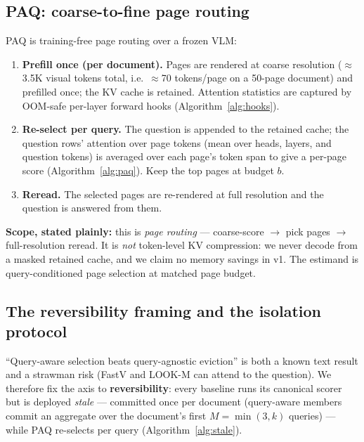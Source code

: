 \documentclass[11pt,letterpaper]{article}
\newcommand{\paq}{\textsc{PAQ}}
\begin{document}
\subsection{\paq{}: coarse-to-fine page routing}\label{sec:method-paq}
\paq{} is training-free page routing over a frozen VLM:
\begin{enumerate}
  \item \textbf{Prefill once (per document).} Pages are rendered at coarse resolution
        ($\approx$3.5K visual tokens total, i.e.\ $\approx$70 tokens/page on a 50-page document)
        and prefilled once; the KV cache is retained. Attention statistics are captured by
        OOM-safe per-layer forward hooks (Algorithm~\ref{alg:hooks}).
  \item \textbf{Re-select per query.} The question is appended to the retained cache; the
        question rows' attention over page tokens (mean over heads, layers, and question tokens)
        is averaged over each page's token span to give a per-page score
        (Algorithm~\ref{alg:paq}). Keep the top pages at budget $b$.
  \item \textbf{Reread.} The selected pages are re-rendered at full resolution and the question
        is answered from them.
\end{enumerate}
\textbf{Scope, stated plainly:} this is \emph{page routing} --- coarse-score $\to$ pick pages
$\to$ full-resolution reread. It is \emph{not} token-level KV compression: we never decode from a
masked retained cache, and we claim no memory savings in v1. The estimand is query-conditioned
page selection at matched page budget.

\subsection{The reversibility framing and the isolation protocol}\label{sec:method-isolation}
``Query-aware selection beats query-agnostic eviction'' is both a known text result
\citep{tang2024quest} and a strawman risk (FastV and LOOK-M can attend to the question). We
therefore fix the axis to \textbf{reversibility}: every baseline runs its canonical scorer but is
deployed \emph{stale} --- committed once per document (query-aware members commit an aggregate
over the document's first $M=\min(3,k)$ queries) --- while \paq{} re-selects per query
(Algorithm~\ref{alg:stale}).
\end{document}
